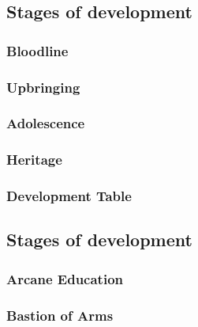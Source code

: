 
 \newpage
\subsection{Stages of development}
\subsubsection{Bloodline}
\subsubsection{Upbringing}
\subsubsection{Adolescence}
\subsubsection{Heritage}
\subsubsection{Development Table}
\subsection{Stages of development}
\subsubsection{Arcane Education}
\subsubsection{Bastion of Arms}
